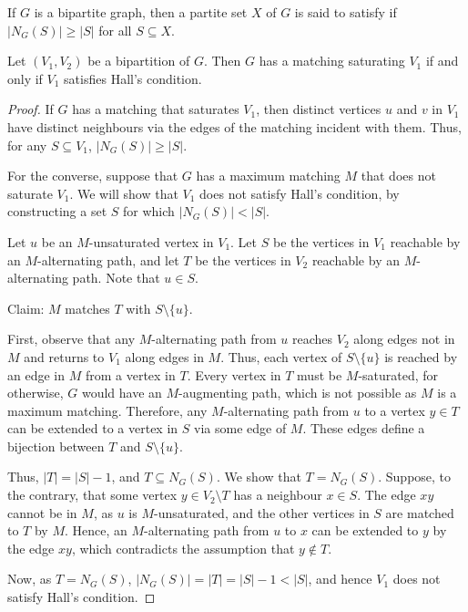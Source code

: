 If $G$ is a bipartite graph, then a partite set $X$ of $G$ is said to satisfy  if $|N_G(S)| \ge |S|$ for all $S \subseteq X$.

\begin{Theorem}\label{thm:Hall}
Let $(V_1,V_2)$ be a bipartition of $G$. Then $G$ has a matching saturating $V_1$ if and only if $V_1$ satisfies Hall's condition.
\end{Theorem}

\begin{proof}
If $G$ has a matching that saturates $V_1$, then distinct vertices $u$ and $v$ in $V_1$ have distinct neighbours via the edges of the matching incident with them. Thus, for any $S \subseteq V_1$, $|N_G(S)| \ge |S|$.

For the converse, suppose that $G$ has a maximum matching $M$ that does not saturate $V_1$. We will show that $V_1$ does not satisfy Hall's condition, by constructing a set $S$ for which $|N_G(S)| < |S|$.

Let $u$ be an $M$-unsaturated vertex in $V_1$. Let $S$ be the vertices in $V_1$ reachable by an $M$-alternating path, and let $T$ be the vertices in $V_2$ reachable by an $M$-alternating path. Note that $u \in S$.

\noindent Claim: $M$ matches $T$ with $S \setminus \{u\}$.

First, observe that any $M$-alternating path from $u$ reaches $V_2$ along edges not in $M$ and returns to $V_1$ along edges in $M$. Thus, each vertex of $S \setminus \{u\}$ is reached by an edge in $M$ from a vertex in $T$. Every vertex in $T$ must be $M$-saturated, for otherwise, $G$ would have an $M$-augmenting path, which is not possible as $M$ is a maximum matching. Therefore, any $M$-alternating path from $u$ to a vertex $y \in T$ can be extended to a vertex in $S$ via some edge of $M$. These edges define a bijection between $T$ and $S \setminus \{u\}$.

Thus, $|T| = |S| - 1$, and $T \subseteq N_G(S)$. We show that $T = N_G(S)$. Suppose, to the contrary, that some vertex $y \in V_2 \setminus T$ has a neighbour $x \in S$. The edge $xy$ cannot be in $M$, as $u$ is $M$-unsaturated, and the other vertices in $S$ are matched to $T$ by $M$. Hence, an $M$-alternating path from $u$ to $x$ can be extended to $y$ by the edge $xy$, which contradicts the assumption that $y \notin T$.

Now, as $T = N_G(S)$, $|N_G(S)| = |T| = |S| - 1 < |S|$, and hence $V_1$ does not satisfy Hall's condition.
\end{proof}

